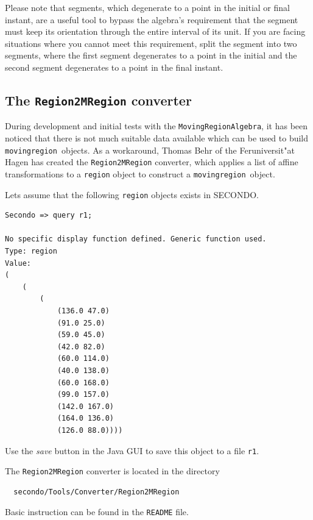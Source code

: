 \documentclass[a4paper,12pt]{article}
\newcommand{\secondo}{{\scshape SE\-CON\-DO}}
\newcommand{\mra}{{\tt Moving\-Region\-Algebra}}
\newcommand{\mr}{{\tt movingregion}}
\begin{document}
Please note that segments, which degenerate to a point in the initial or
final instant, are a useful tool to bypass the algebra's requirement that
the segment must keep its orientation through the entire interval of its
unit. If you are facing situations where you cannot meet this requirement,
split the segment into two segments, where the first segment degenerates to
a point in the initial and the second segment degenerates to a point in the
final instant.

\subsection{The {\tt Region2MRegion} converter}

During development and initial tests with the \mra, it has been noticed
that there is not much suitable data available which can be used to build
\mr\ objects. As a workaround, Thomas Behr of the Feruniversit"at Hagen
has created the
{\tt Region2MRegion} converter, which applies a list of affine
transformations to a {\tt region} object to construct a \mr\ object.

Lets assume that the following {\tt region} objects exists in \secondo.
\begin{verbatim}
Secondo => query r1;

No specific display function defined. Generic function used.
Type: region
Value: 
(
    (
        (
            (136.0 47.0) 
            (91.0 25.0) 
            (59.0 45.0) 
            (42.0 82.0) 
            (60.0 114.0) 
            (40.0 138.0) 
            (60.0 168.0) 
            (99.0 157.0) 
            (142.0 167.0) 
            (164.0 136.0) 
            (126.0 88.0))))
\end{verbatim}
Use the {\em save} button in the Java GUI to save this object to a file
{\tt r1}.

The {\tt Region2MRegion} converter is located in the directory
\begin{verbatim}
  secondo/Tools/Converter/Region2MRegion
\end{verbatim}
Basic instruction can be found in the {\tt README} file.
\end{document}

